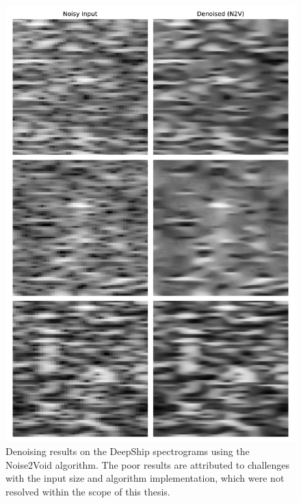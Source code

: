 \begin{figure}[p]
    \centering
    \includegraphics[width=0.7\linewidth]{img/ch6/future_work/n2v_comparison_specs.pdf}
    \caption{Denoising results on the DeepShip spectrograms using the Noise2Void algorithm. The poor results are attributed to challenges with the input size and algorithm implementation, which were not resolved within the scope of this thesis.}
    \label{fig:n2v-results-specs}
\end{figure}



